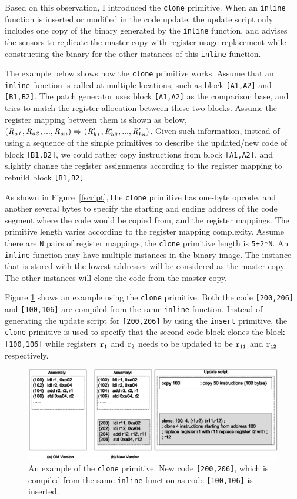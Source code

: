 Based on this observation, I introduced the {\tt clone} primitive. 
When an {\tt inline} function is inserted or modified in the code update, the update script only includes one copy of 
the binary generated by the {\tt inline} function, and advises the sensors to 
replicate the master copy with register usage replacement while constructing the binary for the other instances of this 
{\tt inline} function.

The example below shows how the {\tt clone} primitive works.
Assume that an {\tt inline}
function is called at multiple locations, such as block {\tt [A1,A2]} and {\tt [B1,B2]}. 
The patch generator uses block {\tt [A1,A2]} as the comparison base, 
and tries to match the register allocation between these two blocks. 
Assume the register mapping between them is shown as below, 
$(\it{R_{a1},R_{a2},...,R_{an})\Rightarrow(R_{b1}^\prime,R_{b2}^\prime,...,R_{bn}^\prime)}$.
Given such information, instead of using a sequence of the simple primitives to describe the
updated/new code of block {\tt [B1,B2]}, we could rather copy instructions from block 
{\tt [A1,A2]}, and slightly change the register
assignments according to the register mapping 
to rebuild block {\tt [B1,B2]}.


As shown in Figure~\ref{fscript},The {\tt clone} primitive has one-byte opcode, and another
several bytes to specify the starting and ending address 
of the code segment where the code would be copied from, and the register mappings.
The primitive length varies according to the register mapping complexity.
Assume there are {\tt N} pairs of register mappings, the {\tt clone} primitive length is
{\tt 5+2*N}. An {\tt inline} function may have multiple instances in the binary image. The 
instance that is stored with the lowest addresses will be considered as the master copy.
The other instances will clone the code from the master copy.


Figure \ref{fclone} shows an example using the {\tt clone} primitive.  Both the code {\tt [200,206]} and 
{\tt [100,106]} are compiled from the same {\tt inline} function. Instead of generating the update script for 
{\tt [200,206]} by using the {\tt insert} primitive, the {\tt clone} primitive is used to specify that the second code block 
clones the block {\tt [100,106]} while registers  
${\tt r_1}$ and ${\tt r_2}$ needs to be updated to be ${\tt r_{11}}$ and ${\tt r_{12}}$ respectively.
\begin{figure}[htbp]
\centering
\includegraphics[width=6in]{figures/sclone.eps}
\caption[An example of the {\tt clone} primitive.]{An example of the {\tt clone} primitive. New code {\tt [200,206]}, 
which
is compiled from the same {\tt inline} function as code {\tt [100,106]} is inserted.}
\label{fclone}
\end{figure}


